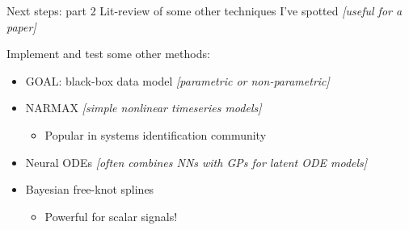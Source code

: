 \documentclass[presentation]{beamer}
\begin{document}
\begin{frame}[label={sec:org3fbfd7d}]{Next steps: part 2}
Lit-review of some other techniques I've spotted \emph{[useful for a paper]}

\vfill

Implement and test some other methods:
\begin{itemize}
\item GOAL: black-box data model \emph{[parametric or non-parametric]}
\item NARMAX \emph{[simple nonlinear timeseries models]}
\begin{itemize}
\item Popular in systems identification community
\end{itemize}
\item Neural ODEs \emph{[often combines NNs with GPs for latent ODE models]}
\item Bayesian free-knot splines
\begin{itemize}
\item Powerful for scalar signals!
\end{itemize}
\end{itemize}
\end{frame}
\end{document}
